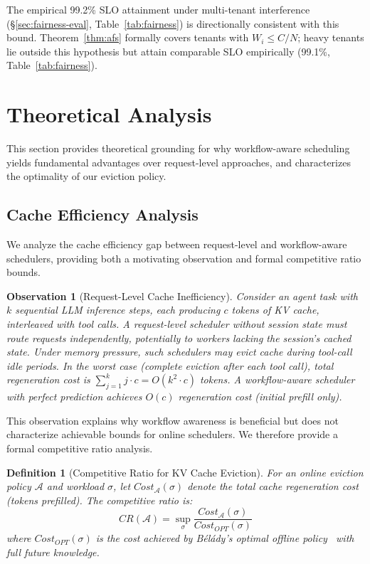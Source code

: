 \documentclass[sigconf]{acmart}
\newtheorem{definition}{Definition}
\newtheorem{observation}{Observation}
\begin{document}
The empirical 99.2\% SLO attainment under multi-tenant interference (\S\ref{sec:fairness-eval}, Table~\ref{tab:fairness}) is directionally consistent with this bound. Theorem~\ref{thm:afs} formally covers tenants with $W_i \leq C/N$; heavy tenants lie outside this hypothesis but attain comparable SLO empirically (99.1\%, Table~\ref{tab:fairness}).

\section{Theoretical Analysis}
\label{sec:theoretical-limits}

This section provides theoretical grounding for why workflow-aware scheduling yields fundamental advantages over request-level approaches, and characterizes the optimality of our eviction policy.

\subsection{Cache Efficiency Analysis}
\label{sec:lower-bound}

We analyze the cache efficiency gap between request-level and workflow-aware schedulers, providing both a motivating observation and formal competitive ratio bounds.

\begin{observation}[Request-Level Cache Inefficiency]
\label{obs:request-level}
Consider an agent task with $k$ sequential LLM inference steps, each producing $c$ tokens of KV cache, interleaved with tool calls. A request-level scheduler without session state must route requests independently, potentially to workers lacking the session's cached state. Under memory pressure, such schedulers may evict cache during tool-call idle periods. In the worst case (complete eviction after each tool call), total regeneration cost is $\sum_{j=1}^{k} j \cdot c = O(k^2 \cdot c)$ tokens. A workflow-aware scheduler with perfect prediction achieves $O(c)$ regeneration cost (initial prefill only).
\end{observation}

This observation explains why workflow awareness is beneficial but does not characterize achievable bounds for online schedulers. We therefore provide a formal competitive ratio analysis.

\begin{definition}[Competitive Ratio for KV Cache Eviction]
For an online eviction policy $\mathcal{A}$ and workload $\sigma$, let $Cost_{\mathcal{A}}(\sigma)$ denote the total cache regeneration cost (tokens prefilled). The competitive ratio is:
\begin{equation}
    CR(\mathcal{A}) = \sup_{\sigma} \frac{Cost_{\mathcal{A}}(\sigma)}{Cost_{OPT}(\sigma)}
\end{equation}
where $Cost_{OPT}(\sigma)$ is the cost achieved by B\'{e}l\'{a}dy's optimal offline policy~\cite{belady1966replacement} with full future knowledge.
\end{definition}
\end{document}
